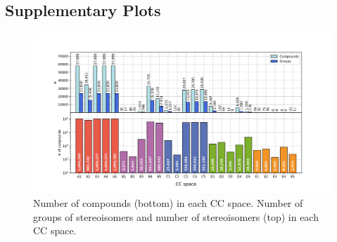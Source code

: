 \setcounter{section}{3} %
\setcounter{figure}{0}  %
\label{Stereoisomers_SupplementaryInformation}

\subsection{Supplementary Plots}



\begin{figure}[htbp]
  \centering
  \includegraphics[width=1\linewidth]{figures/Stereoisomers/Supplementary/FigS1.png}
  \caption{Number of compounds (bottom) in each CC space. Number of groups of stereoisomers and number of stereoisomers (top) in each CC space.}
  \label{Stereoisomers_FigS1}
\end{figure}



